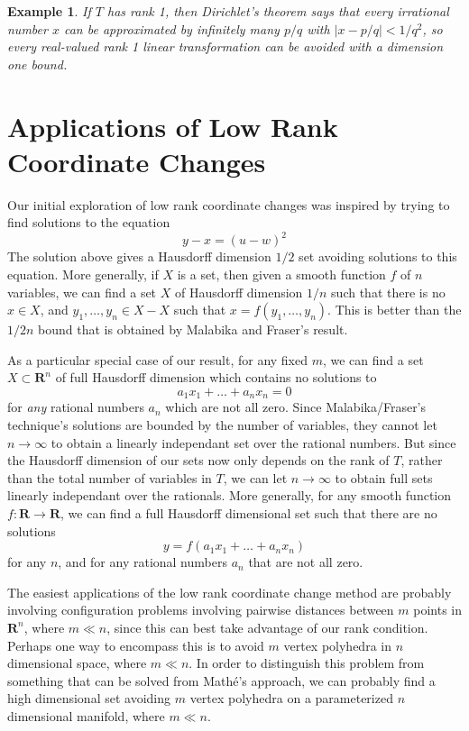 \documentclass{report}
\theoremstyle{plain}
\newtheorem*{example}{Example}
\theoremstyle{plain}
\begin{document}
\begin{example}
    If $T$ has rank 1, then Dirichlet's theorem says that every irrational number $x$ can be approximated by infinitely many $p/q$ with $|x - p/q| < 1/q^2$, so every real-valued rank 1 linear transformation can be avoided with a dimension one bound.
\end{example}

\section{Applications of Low Rank Coordinate Changes}

Our initial exploration of low rank coordinate changes was inspired by trying to find solutions to the equation
%
\[ y - x = (u - w)^2 \]
%
The solution above gives a Hausdorff dimension $1/2$ set avoiding solutions to this equation. More generally, if $X$ is a set, then given a smooth function $f$ of $n$ variables, we can find a set $X$ of Hausdorff dimension $1/n$ such that there is no $x \in X$, and $y_1, \dots, y_n \in X - X$ such that $x = f(y_1, \dots, y_n)$. This is better than the $1/2n$ bound that is obtained by Malabika and Fraser's result.

As a particular special case of our result, for any fixed $m$, we can find a set $X \subset \mathbf{R}^n$ of full Hausdorff dimension which contains no solutions to
%
\[ a_1x_1 + \dots + a_nx_n = 0 \]
%
for {\it any} rational numbers $a_n$ which are not all zero. Since Malabika/Fraser's technique's solutions are bounded by the number of variables, they cannot let $n \to \infty$ to obtain a linearly independant set over the rational numbers. But since the Hausdorff dimension of our sets now only depends on the rank of $T$, rather than the total number of variables in $T$, we can let $n \to \infty$ to obtain full sets linearly independant over the rationals. More generally, for any smooth function $f: \mathbf{R} \to \mathbf{R}$, we can find a full Hausdorff dimensional set such that there are no solutions
%
\[ y = f(a_1x_1 + \dots + a_nx_n) \]
%
for any $n$, and for any rational numbers $a_n$ that are not all zero.

The easiest applications of the low rank coordinate change method are probably involving configuration problems involving pairwise distances between $m$ points in $\mathbf{R}^n$, where $m \ll n$, since this can best take advantage of our rank condition. Perhaps one way to encompass this is to avoid $m$ vertex polyhedra in $n$ dimensional space, where $m \ll n$. In order to distinguish this problem from something that can be solved from Math\'{e}'s approach, we can probably find a high dimensional set avoiding $m$ vertex polyhedra on a parameterized $n$ dimensional manifold, where $m \ll n$.
\end{document}
